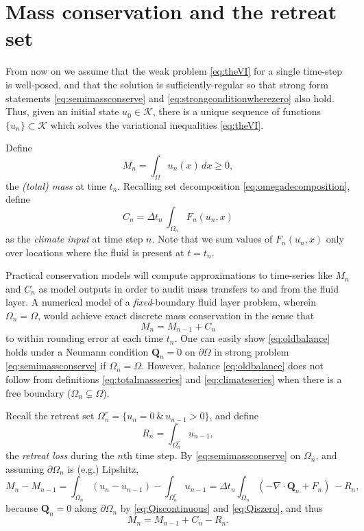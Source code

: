 \documentclass[final,onefignum]{siamart190516}
\newcommand\bQ{\mathbf{Q}}
\newcommand{\Div}{\nabla\cdot}
\begin{document}
\section{Mass conservation and the retreat set}  \label{sec:timeseries}

From now on we assume that the weak problem \eqref{eq:theVI} for a single time-step is well-posed, and that the solution is sufficiently-regular so that strong form statements \eqref{eq:semimassconserve} and \eqref{eq:strongconditionwherezero} also hold.  Thus, given an initial state $u_0\in\mathcal{K}$, there is a unique sequence of functions $\{u_n\} \subset \mathcal{K}$ which solves the variational inequalities \eqref{eq:theVI}.

Define
\begin{equation}
M_n = \int_\Omega u_n(x)\,dx \ge 0, \label{eq:totalmassseries}
\end{equation}
the \emph{(total) mass} at time $t_n$.  Recalling set decomposition \eqref{eq:omegadecomposition}, define
\begin{equation}
C_n = \Delta t_n\, \int_{\Omega_n} F_n(u_n,x) \label{eq:climateseries}
\end{equation}
as the \emph{climate input} at time step $n$.  Note that we sum values of $F_n(u_n,x)$ only over locations where the fluid is present at $t=t_n$.

Practical conservation models will compute approximations to time-series like $M_n$ and $C_n$ as model outputs in order to audit mass transfers to and from the fluid layer.  A numerical model of a \emph{fixed}-boundary fluid layer problem, wherein $\Omega_n=\Omega$, would achieve exact discrete mass conservation in the sense that
\begin{equation}
M_n = M_{n-1} + C_n \label{eq:oldbalance}
\end{equation}
to within rounding error at each time $t_n$.  One can easily show \eqref{eq:oldbalance} holds under a Neumann condition $\bQ_n=0$ on $\partial \Omega$ in strong problem \eqref{eq:semimassconserve} if $\Omega_n=\Omega$.  However, balance \eqref{eq:oldbalance} does not follow from definitions \eqref{eq:totalmassseries} and \eqref{eq:climateseries} when there is a free boundary ($\Omega_n \subsetneq \Omega$).

Recall the retreat set $\Omega_n^r=\{u_n = 0 \,\&\,u_{n-1}>0\}$, and define
\begin{equation}
R_n = \int_{\Omega_n^r} u_{n-1}, \label{eq:retreatlossseries}
\end{equation}
the \emph{retreat loss} during the $n$th time step.  By \eqref{eq:semimassconserve} on $\Omega_n$, and assuming $\partial \Omega_n$ is (e.g.) Lipshitz,
    $$M_n - M_{n-1} = \int_{\Omega_n} (u_n - u_{n-1}) - \int_{\Omega_n^r} u_{n-1} = \Delta t_n \int_{\Omega_n} (- \Div \bQ_n + F_n) \, - R_n,$$
because $\bQ_n=0$ along $\partial \Omega_n$ by \eqref{eq:Qiscontinuous} and \eqref{eq:Qiszero}, and thus
\begin{equation}
M_n = M_{n-1} + C_n - R_n. \label{eq:newbalance}
\end{equation}
\end{document}
